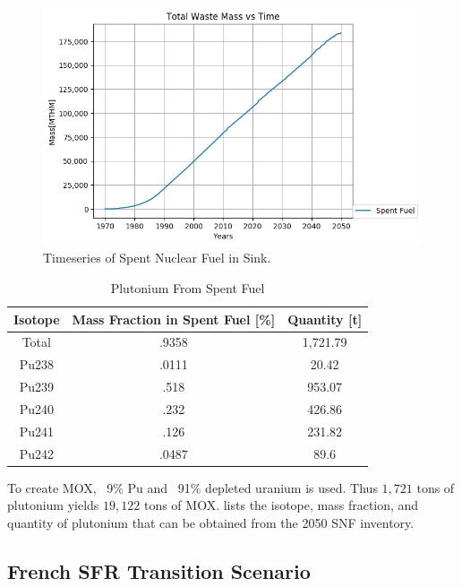 \begin{figure}[htbp!]
	\begin{center}
			\includegraphics[width=\columnwidth]{./images/eu_future/snf.png}
	\end{center}
	\caption{Timeseries of Spent Nuclear Fuel in Sink.}
	\label{fig:eu_snf}
\end{figure}

\begin{table}[h]
	\centering
	\begin{tabular}{|c|c|c|}
		\hline
		Isotope & Mass Fraction in Spent Fuel [\%] & Quantity [t] \\ \hline
		Total & .9358 & 1,721.79 \\ \hline
		Pu238 & .0111 & 20.42 \\ \hline
		Pu239 & .518 & 953.07 \\ \hline
		Pu240 & .232 & 426.86 \\ \hline
		Pu241 & .126 & 231.82 \\ \hline
		Pu242 & .0487 & 89.6 \\ \hline
	\end{tabular}
	\caption{Plutonium From Spent Fuel}
	\label{tab:pu}
\end{table}


To create \gls{MOX}, ~9\% Pu and ~91\% depleted uranium is used.
Thus $1,721$ tons of plutonium yields $19,122$ tons of
\gls{MOX}.  lists the isotope, mass fraction,
and quantity of plutonium that can be obtained from the 2050 \gls{SNF} inventory.


\subsection{French \gls{SFR} Transition Scenario}


